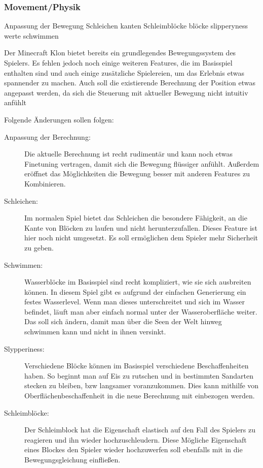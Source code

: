 \documentclass{article}
\begin{document}
\subsubsection{Movement/Physik}

Anpassung der Bewegung
Schleichen kanten
Schleimblöcke
blöcke slipperyness werte
schwimmen

Der Minecraft Klon bietet bereits ein grundlegendes Bewegungssystem des Spielers. Es fehlen jedoch noch einige weiteren Features, die im Basisspiel enthalten sind und auch einige zusätzliche Spielereien, um das Erlebnis etwas spannender zu machen. Auch soll die existierende Berechnung der Position etwas angepasst werden, da sich die Steuerung mit aktueller Bewegung nicht intuitiv anfühlt

Folgende Änderungen sollen folgen:

\begin{description}
  \item[Anpassung der Berechnung:] Die aktuelle Berechnung ist recht rudimentär und kann noch etwas Finetuning vertragen, damit sich die Bewegung flüssiger anfühlt. Außerdem eröffnet das Möglichkeiten die Bewegung besser mit anderen Features zu Kombinieren.
  \item[Schleichen:] Im normalen Spiel bietet das Schleichen die besondere Fähigkeit, an die Kante von Blöcken zu laufen und nicht herunterzufallen. Dieses Feature ist hier noch nicht umgesetzt. Es soll ermöglichen dem Spieler mehr Sicherheit zu geben.
  \item[Schwimmen:] Wasserblöcke im Basisspiel sind recht kompliziert, wie sie sich ausbreiten können. In diesem Spiel gibt es aufgrund der einfachen Generierung ein festes Wasserlevel. Wenn man dieses unterschreitet und sich im Wasser befindet, läuft man aber einfach normal unter der Wasseroberfläche weiter. Das soll sich ändern, damit man über die Seen der Welt hinweg schwimmen kann und nicht in ihnen versinkt.
  \item[Slypperiness:] Verschiedene Blöcke können im Basisspiel verschiedene Beschaffenheiten haben. So beginnt man auf Eis zu rutschen und in bestimmten Sandarten stecken zu bleiben, bzw langsamer voranzukommen. Dies kann mithilfe von Oberflächenbeschaffenheit in die neue Berechnung mit einbezogen werden.
  \item[Schleimblöcke:] Der Schleimblock hat die Eigenschaft elastisch auf den Fall des Spielers zu reagieren und ihn wieder hochzuschleudern. Diese Mögliche Eigenschaft eines Blockes den Spieler wieder hochzuwerfen soll ebenfalls mit in die Bewegungsgleichung einfließen.
\end{description}
\end{document}
